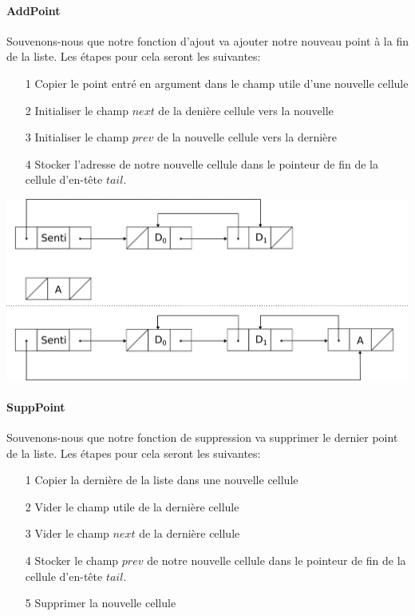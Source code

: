 \documentclass[a4paper, 11pt, oneside]{article}
\begin{document}
\paragraph{AddPoint}
\smallskip

Souvenons-nous que notre fonction d'ajout va ajouter notre nouveau point à la fin de la liste. Les étapes pour cela seront les suivantes:
\begin{itemize}
    \item[1] Copier le point entré en argument dans le champ utile d'une nouvelle cellule
    \item[2] Initialiser le champ $next$ de la denière cellule vers la nouvelle
    \item[3] Initialiser le champ $prev$ de la nouvelle cellule vers la dernière
    \item[4] Stocker l'adresse de notre nouvelle cellule dans le pointeur de fin de la cellule d'en-tête $tail$.
\end{itemize}

\bigskip

\includegraphics[scale=0.8]{Add.png}


\paragraph{SuppPoint}
\smallskip

Souvenons-nous que notre fonction de suppression va supprimer le dernier point de la liste. Les étapes pour cela seront les suivantes:
\begin{itemize}
    \item[1] Copier la dernière de la liste dans une nouvelle cellule
    \item[2] Vider le champ utile de la dernière cellule
    \item[3] Vider le champ $next$ de la dernière cellule
    \item[4] Stocker le champ $prev$ de notre nouvelle cellule dans le pointeur de fin de la cellule d'en-tête $tail$.
    \item[5] Supprimer la nouvelle cellule
\end{itemize}
\end{document}
